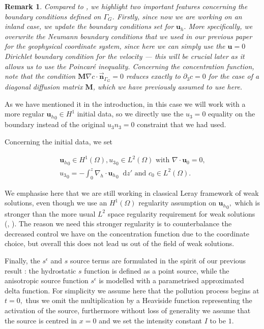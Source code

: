 \documentclass[11pt]{article}
\newtheorem{remark}{Remark}
\newcommand*\diff{\mathop{}\!\mathrm{d}}
\begin{document}
\begin{remark}
Compared to \cite{pollatmws2019}, we highlight two important features concerning the boundary conditions defined on $\Gamma_G$. Firstly, since now we are working on an inland case, we update the boundary conditions set for $\mathbf{u}_h.$ More specifically, we overwrite the Neumann boundary conditions that we used in our previous paper for the geophysical coordinate system, since here we can simply use the $\mathbf{u}=0$ Dirichlet boundary condition for the velocity --- this will be crucial later as it allows us to use the Poincar\'e inequality. Concerning the concentration function, note that the condition $\mathbf{M} \nabla c \cdot \vec{\boldsymbol{n}}_{\Gamma_G} = 0$ reduces exactly to $\partial_3 c = 0$ for the case of a diagonal diffusion matrix $\mathbf{M}$, which we have previously assumed to use here.
\end{remark}

As we have mentioned it in the introduction, in this case we will work with a more regular ${\mathbf{u}_h}_0 \in H^1$ initial data, so we directly use the $u_3 = 0$ equality on the boundary instead of the original $u_3 n_3 = 0$ constraint that we had used.

Concerning the initial data, we set

\begin{equation}
\begin{gathered}\label{DWMC_weak_initial_data_regularities}
{\mathbf{u}_h}_0 \in H^1 (\Omega), {u_3}_0 \in L^2(\Omega) \text{ with } \nabla \cdot \mathbf{u}_0 = 0,\\
{u_3}_0 = - \int_0^z \nabla_h \cdot {\mathbf{u}_h}_0 \diff z' \text{ and } c_0 \in L^2 (\Omega).
\end{gathered}
\end{equation}

We emphasise here that we are still working in classical Leray framework of weak solutions, even though we use an $H^1(\Omega)$ regularity assumption on ${\mathbf{u}_h}_0,$ which is stronger than the more usual $L^2$ space regularity requirement for weak solutions (\cite{azerad2001mathematical}, \cite{pollatmws2019}). The reason we need this stronger regularity is to counterbalance the decreased control we have on the concentration function due to the coordinate choice, but overall this does not lead us out of the field of weak solutions.

Finally, the $s^\epsilon$ and $s$ source terms are formulated in the spirit of our previous result \cite{pollatmws2019}: the hydrostatic $s$ function is defined as a point source, while the anisotropic source function $s^\epsilon$ is modelled with a parametrised approximated delta function. For simplicity we assume here that the pollution process begins at $t = 0,$ thus we omit the multiplication by a Heaviside function representing the activation of the source, furthermore without loss of generality we assume that the source is centred in $x=0$ and we set the intensity constant $I$ to be $1.$
\end{document}
